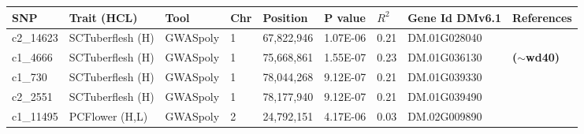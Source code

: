 \documentclass[pdflatex,sn-mathphys-ay]{sn-jnl}%
\begin{document}
\begin{landscape}
\begin{table}[]
\begin{tabular}{lllllllll}
\hline 
SNP                              & Trait (HCL)                             & Tool                            & Chr               & Position                          & P value                         & $R^2$                          & Gene Id  DMv6.1                              & References                                                                   \\
\hline
\hline
\rowcolor[HTML]{FFFFD7} 
c2\_14623 &SCTuberflesh (H) &GWASpoly &1 &67,822,946 &1.07E-06 &0.21 &DM.01G028040 &\citep{sharma2024genotyping}\\
\cellcolor[HTML]{FFFFD7}c1\_4666                         & \cellcolor[HTML]{FFFFD7}SCTuberflesh (H)                        & \cellcolor[HTML]{FFFFD7} GWASpoly & \cellcolor[HTML]{FFFFD7}1                        & \cellcolor[HTML]{FFFFD7}75,668,861                        & \cellcolor[HTML]{FFFFD7}1.55E-07                        & \cellcolor[HTML]{FFFFD7}0.23                        & \cellcolor[HTML]{FFFFD7}DM.01G036130                        & \cellcolor[HTML]{FFFFD7}\textbf{($\sim$wd40)} \citep{liu2020wd40,sajeevan2023comprehensive}                            \\
\rowcolor[HTML]{FFFFD7} 
c1\_730                          & SCTuberflesh (H)                        & GWASpoly                        & 1                        & 78,044,268                        & 9.12E-07                        & 0.21                        & DM.01G039330                        & \citep{sharma2024genotyping}                                                        \\
\rowcolor[HTML]{FFFFD7} 
c2\_2551                         & SCTuberflesh (H)                        & GWASpoly                        & 1                        & 78,177,940                        & 9.12E-07                        & 0.21                        & DM.01G039490                        & \citep{sharma2024genotyping}                                                        \\
\rowcolor[HTML]{FFFFD7} 
c1\_11495                        & PCFlower (H,L)                          & GWASpoly                        & 2                        & 24,792,151                        & 4.17E-06                        & 0.03                        & DM.02G009890                        & \citep{sharma2024genotyping,Berdugo2017}\\

\end{tabular}
\end{table}
\end{landscape}
\end{document}
